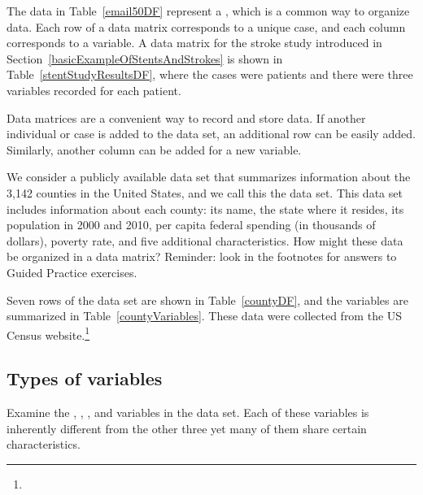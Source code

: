 The data in Table~\ref{email50DF} represent a , which is a common way to organize data. Each row of a data matrix corresponds to a unique case, and each column corresponds to a variable. A data matrix for the stroke study introduced in Section~\ref{basicExampleOfStentsAndStrokes} is shown in Table~\vref{stentStudyResultsDF}, where the cases were patients and there were three variables recorded for each patient.

Data matrices are a convenient way to record and store data. If another individual or case is added to the data set, an additional row can be easily added. Similarly, another column can be added for a new variable.


\begin{exercisewrap}
\begin{nexercise}
We consider a publicly available data set that summarizes information about the 3,142 counties in the United States, and we call this the  data set. This data set includes information about each county: its name, the state where it resides, its population in 2000 and 2010, per capita federal spending (in thousands of dollars), poverty rate, and five additional characteristics. How might these data be organized in a data matrix? Reminder: look in the footnotes for answers to Guided Practice exercises.\footnotemark
\end{nexercise}
\end{exercisewrap}

\noindent Seven rows of the  data set are shown in Table~\ref{countyDF}, and the variables are summarized in Table~\ref{countyVariables}. These data were collected from the US Census website.\footnote{}


\subsection{Types of variables}
\label{variableTypes}

Examine the , , , and  variables in the  data set. Each of these variables is inherently different from the other three yet many of them share certain characteristics.

